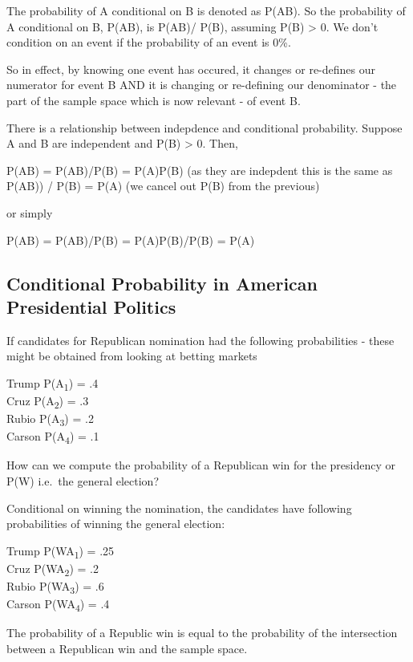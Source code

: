 \documentclass[]{book}
\theoremstyle{definition}
\theoremstyle{definition}
\theoremstyle{definition}
\theoremstyle{remark}
\begin{document}
The probability of A conditional on B is denoted as P(A\textbar{}B). So
the probability of A conditional on B, P(A\textbar{}B), is P(AB)/ P(B),
assuming P(B) \textgreater{} 0. We don't condition on an event if the
probability of an event is 0\%.

So in effect, by knowing one event has occured, it changes or re-defines
our numerator for event B AND it is changing or re-defining our
denominator - the part of the sample space which is now relevant - of
event B.

There is a relationship between indepdence and conditional probability.
Suppose A and B are independent and P(B) \textgreater{} 0. Then,

P(A\textbar{}B) = P(AB)/P(B) = P(A)P(B) (as they are indepdent this is
the same as P(AB)) / P(B) = P(A) (we cancel out P(B) from the previous)

or simply

P(A\textbar{}B) = P(AB)/P(B) = P(A)P(B)/P(B) = P(A)

\subsection{Conditional Probability in American Presidential
Politics}\label{conditional-probability-in-american-presidential-politics}

If candidates for Republican nomination had the following probabilities
- these might be obtained from looking at betting markets

Trump P(A\textsubscript{1}) = .4\\
Cruz P(A\textsubscript{2}) = .3\\
Rubio P(A\textsubscript{3}) = .2\\
Carson P(A\textsubscript{4}) = .1

How can we compute the probability of a Republican win for the
presidency or P(W) i.e.~the general election?

Conditional on winning the nomination, the candidates have following
probabilities of winning the general election:

Trump P(W\textbar{}A\textsubscript{1}) = .25\\
Cruz P(W\textbar{}A\textsubscript{2}) = .2\\
Rubio P(W\textbar{}A\textsubscript{3}) = .6\\
Carson P(W\textbar{}A\textsubscript{4}) = .4

The probability of a Republic win is equal to the probability of the
intersection between a Republican win and the sample space.
\end{document}
